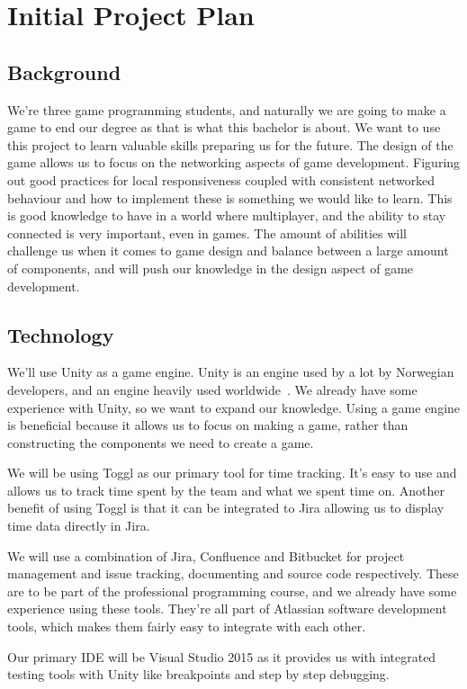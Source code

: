 \chapter{Initial Project Plan}
\section{Background}
We’re three game programming students, and naturally we are going to make a game to end our degree as that is what this bachelor is about. We want to use this project to learn valuable skills preparing us for the future. The design of the game allows us to focus on the networking aspects of game development. Figuring out good practices for local responsiveness coupled with consistent networked behaviour and how to implement these is something we would like to learn. This is good knowledge to have in a world where multiplayer, and the ability to stay connected is very important, even in games.
The amount of abilities will challenge us when it comes to game design and balance between a large amount of components, and will push our knowledge in the design aspect of game development. 

\section{Technology}
We’ll use Unity as a game engine. Unity is an engine used by a lot by Norwegian developers, and an engine heavily used worldwide~\cite{unityUsageStatistics}. We already have some experience with Unity, so we want to expand our knowledge. 
Using a game engine is beneficial because it allows us to focus on making a game, rather than constructing the components we need to create a game. 

We will be using Toggl as our primary tool for time tracking. It’s easy to use and allows us to track time spent by the team and what we spent time on. Another benefit of using Toggl is that it can be integrated to Jira allowing us to display time data directly in Jira. 

We will use a combination of Jira, Confluence and Bitbucket for project management and issue tracking, documenting and source code respectively. These are to be part of the professional programming course, and we already have some experience using these tools. They’re all part of Atlassian software development tools, which makes them fairly easy to integrate with each other.

Our primary IDE will be Visual Studio 2015 as it provides us with integrated testing tools with Unity like breakpoints and step by step debugging.  

